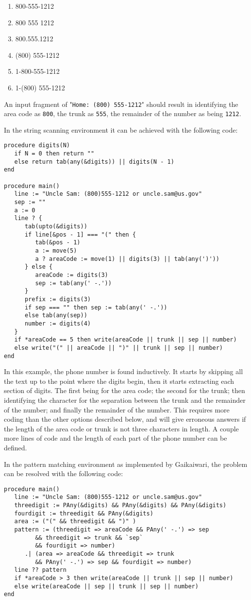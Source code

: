 \documentclass{article}
\begin{document}
\begin{enumerate}
\item 800-555-1212
\item 800 555 1212
\item 800.555.1212
\item (800) 555-1212
\item 1-800-555-1212
\item 1-(800) 555-1212
\end{enumerate}

An input fragment of "\texttt{Home: (800) 555-1212}" should result in identifying the area code as \texttt{800}, the trunk as \texttt{555}, the remainder of the number as being \texttt{1212}.

In the string scanning environment it can be achieved with the following code:
\begin{verbatim}
procedure digits(N)
   if N = 0 then return ""
   else return tab(any(&digits)) || digits(N - 1)
end

procedure main()
   line := "Uncle Sam: (800)555-1212 or uncle.sam@us.gov"
   sep := ""
   a := 0
   line ? {
      tab(upto(&digits))
      if line[&pos - 1] === "(" then {
         tab(&pos - 1)
         a := move(5)
         a ? areaCode := move(1) || digits(3) || tab(any(')'))
      } else {
         areaCode := digits(3)
         sep := tab(any(' -.'))
      } 
      prefix := digits(3)
      if sep === "" then sep := tab(any(' -.'))
      else tab(any(sep))
      number := digits(4)
   }
   if *areaCode == 5 then write(areaCode || trunk || sep || number)
   else write("(" || areaCode || ")" || trunk || sep || number)
end
\end{verbatim}
In this example, the phone number is found inductively.  It starts by skipping all the text up to the point where the digits begin, then it starts extracting each section of digits.  The first being for the area code; the second for the trunk; then identifying the character for the separation between the trunk and the remainder of the number; and finally the remainder of the number.  This requires more coding than the other options described below, and will give erroneous answers if the length of the area code or trunk is not three characters in length.  A couple more lines of code and the length of each part of the phone number can be defined.

In the pattern matching environment as implemented by Gaikaiwari, the problem can be resolved with the following code:
\begin{verbatim}
procedure main()
   line := "Uncle Sam: (800)555-1212 or uncle.sam@us.gov"
   threedigit := PAny(&digits) && PAny(&digits) && PAny(&digits)
   fourdigit := threedigit && PAny(&digits)
   area := ("(" && threedigit && ")" )
   pattern := (threedigit => areaCode && PAny(' -.') => sep
         && threedigit => trunk && `sep`
         && fourdigit => number)
      .| (area => areaCode && threedigit => trunk
         && PAny(' -.') => sep && fourdigit => number)
   line ?? pattern
   if *areaCode > 3 then write(areaCode || trunk || sep || number) 
   else write(areaCode || sep || trunk || sep || number) 
end
\end{verbatim}
\end{document}
